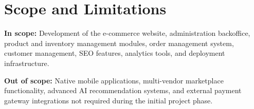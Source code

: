 \section*{Scope and Limitations}

\textbf{In scope:} Development of the e-commerce website, administration backoffice, product and inventory management modules, order management system, customer management, SEO features, analytics tools, and deployment infrastructure.

\textbf{Out of scope:} Native mobile applications, multi-vendor marketplace functionality, advanced AI recommendation systems, and external payment gateway integrations not required during the initial project phase.